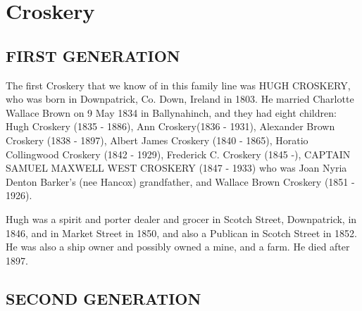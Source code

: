 \section{Croskery}

\subsection{FIRST GENERATION}

The first Croskery that we know of in this family line was \uppercase{Hugh Croskery}, who was born in Downpatrick, Co. Down, Ireland in 1803.  He married Charlotte Wallace Brown on 9 May 1834 in Ballynahinch,  and they had eight children: Hugh Croskery (1835 - 1886), Ann Croskery(1836 - 1931), Alexander Brown Croskery (1838 - 1897), Albert James Croskery (1840 - 1865), Horatio Collingwood Croskery (1842 - 1929), Frederick C. Croskery (1845 -), \uppercase{Captain Samuel Maxwell West Croskery} (1847 - 1933) who was Joan Nyria Denton Barker's (nee Hancox) grandfather, and Wallace Brown Croskery (1851 - 1926).

Hugh was a spirit and porter dealer and grocer in Scotch Street, Downpatrick, in 1846, and in Market Street in 1850, and also a Publican in Scotch Street in 1852. He was also a ship owner and possibly owned a mine, and a farm. He died after 1897.

\subsection{SECOND GENERATION}

